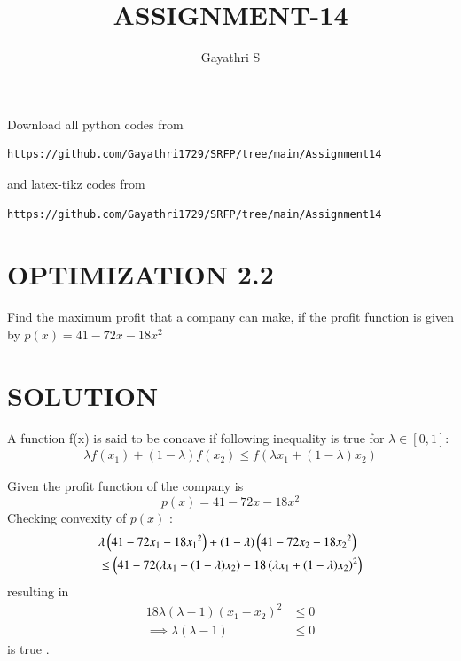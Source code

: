 \documentclass[journal,12pt,twocolumn]{IEEEtran}
\begin{document}
     \def\rightbox#1{\makebox[0in][r]{#1}}
     \def\centbox#1{\makebox[0in]{#1}}
     \def\topbox#1{\raisebox{-\baselineskip}[0in][0in]{#1}}
     \def\midbox#1{\raisebox{-0.5\baselineskip}[0in][0in]{#1}}
\vspace{3cm}
\title{ASSIGNMENT-14}
\author{Gayathri S}
\maketitle
\newpage
\bigskip
\renewcommand{\thefigure}{\theenumi}
\renewcommand{\thetable}{\theenumi}
%
  Download all python codes from 
\begin{lstlisting}
https://github.com/Gayathri1729/SRFP/tree/main/Assignment14
\end{lstlisting}
%
and latex-tikz codes from 
%
\begin{lstlisting}
https://github.com/Gayathri1729/SRFP/tree/main/Assignment14
\end{lstlisting}
%
\section{OPTIMIZATION 2.2}
 Find the maximum profit that a company can
make, if the profit function is given by
$p(x)=41-72x-18x^2$

\section{SOLUTION}
\begin{lemma}
A function f(x) is said to be concave if following inequality is true for $\lambda \in [0,1] :$  \label{lemma1}
\begin{align}
    \lambda f(x_1) + (1-\lambda)f(x_2) \leq f(\lambda x_1 + (1-\lambda)x_2)
\end{align}
\end{lemma}
Given the profit function of the company is
\begin{equation}
    p(x)=41-72x-18x^2
\end{equation}
Checking convexity of $p(x)$ :
\begin{equation}
\begin{aligned}
    &\lambda\left(41-72{x_1}-18{x_1}^2\right) + 
    (1-\lambda)\left(41-72 {x_2}-18 {x_2}^2\right) \\ &\leq
    \left(41-72(\lambda x_1 + (1-\lambda)x_2)-18\left(\lambda x_1 + (1-\lambda)x_2\right)^2\right) 
\end{aligned}
\end{equation}
resulting in
\begin{align}
    18\lambda(\lambda - 1)({x_1} -{x_2})^2 &\leq 0\\
    \implies \lambda(\lambda - 1)&\leq 0
\end{align}is true .
\end{document}
